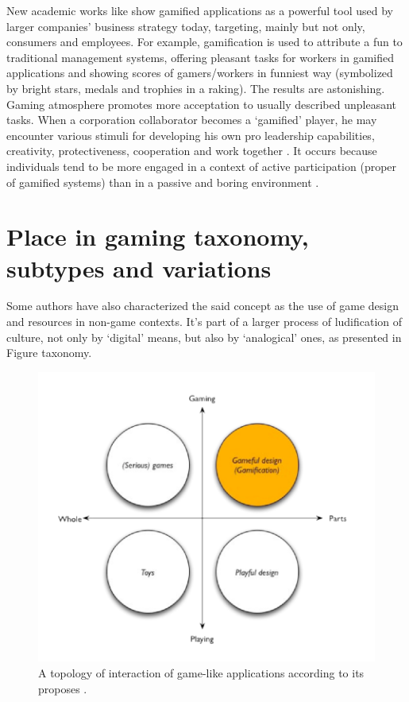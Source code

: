 New academic works like \citep{Gartner} show gamified applications as a powerful tool used by larger companies' business strategy today, targeting, mainly but not only, consumers and employees. For example, gamification is used to attribute a fun to traditional management systems, offering pleasant tasks for workers in gamified applications and showing scores of gamers/workers in funniest way (symbolized by bright stars, medals and trophies in a raking). The results are astonishing. Gaming atmosphere promotes more acceptation to usually described unpleasant tasks. When a corporation collaborator becomes a `gamified' player, he may encounter various stimuli for developing his own pro leadership capabilities, creativity, protectiveness, cooperation and work together \citep{Zich}. It occurs because individuals tend to be more engaged in a context of active participation (proper of gamified systems) than in a passive and boring environment \citep{Medina}.

\section{Place in gaming taxonomy, subtypes and variations}
Some authors \citep{gameAcm} have also characterized the said concept as the use of game design and resources in non-game contexts. It's part of a larger process of ludification of culture, not only by `digital' means, but also by `analogical' ones, as presented in Figure \figurename{taxonomy}.


\begin{figure}[h]
\begin{center}
  \includegraphics[width=14cm]{chapters/gamification/img/taxonomy.png}
  \caption{A topology of interaction of game-like applications according to its proposes \citep{gameAcm}.}
  \label{taxonomy}
\end{center}
\end{figure}



